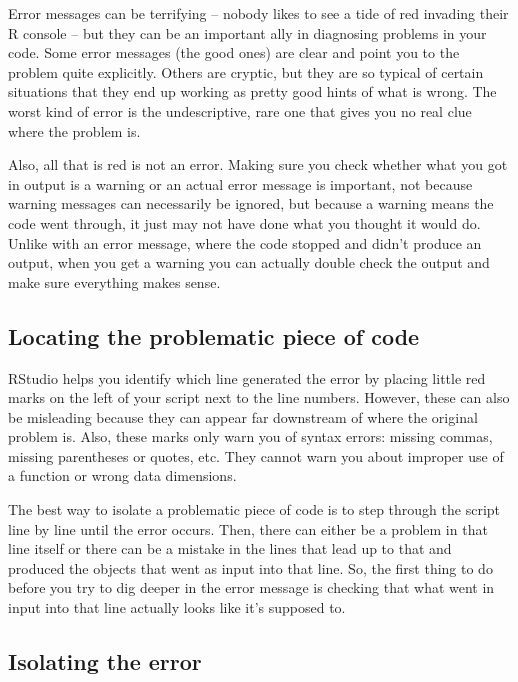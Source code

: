 \documentclass[
]{book}
\begin{document}
Error messages can be terrifying -- nobody likes to see a tide of red invading
their R console -- but they can be an important ally in diagnosing problems in
your code. Some error messages (the good ones) are clear and point you to the
problem quite explicitly. Others are cryptic, but they are so typical of
certain situations that they end up working as pretty good hints of what is
wrong. The worst kind of error is the undescriptive, rare one that gives you no
real clue where the problem is.

Also, all that is red is not an error. Making sure you check whether what you
got in output is a warning or an actual error message is important, not because
warning messages can necessarily be ignored, but because a warning means the
code went through, it just may not have done what you thought it would do.
Unlike with an error message, where the code stopped and didn't produce an
output, when you get a warning you can actually double check the output and
make sure everything makes sense.

\hypertarget{locating-the-problematic-piece-of-code}{%
\subsection{Locating the problematic piece of code}\label{locating-the-problematic-piece-of-code}}

RStudio helps you identify which line generated the error by placing little red
marks on the left of your script next to the line numbers. However, these can
also be misleading because they can appear far downstream of where the original
problem is. Also, these marks only warn you of syntax errors: missing commas,
missing parentheses or quotes, etc. They cannot warn you about improper use of
a function or wrong data dimensions.

The best way to isolate a problematic piece of code is to step through the
script line by line until the error occurs. Then, there can either be a problem
in that line itself or there can be a mistake in the lines that lead up to that
and produced the objects that went as input into that line. So, the first thing
to do before you try to dig deeper in the error message is checking that what
went in input into that line actually looks like it's supposed to.

\hypertarget{isolating-the-error}{%
\subsection{Isolating the error}\label{isolating-the-error}}
\end{document}
